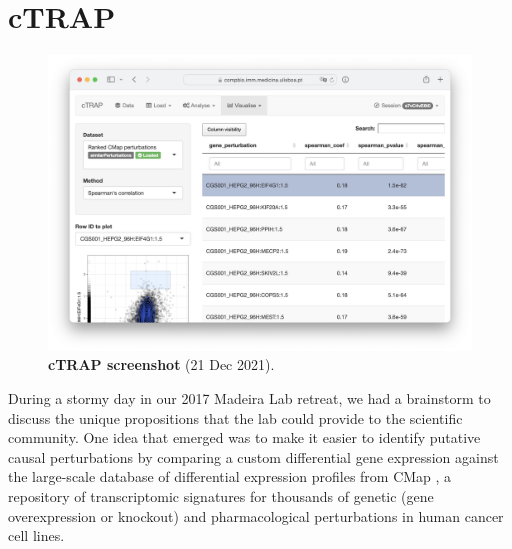
\chapter{cTRAP}
\label{chap:ctrap}

\begin{figure}[!b]
  \vspace*{-1cm}
  \includegraphics[width=.96\textwidth]{images/cTRAP/screenshot}
  \centering
  \vspace*{-.5cm}
  \caption[cTRAP screenshot]{\textbf{cTRAP screenshot} (21 Dec 2021).}
  \label{fig:cTRAP-screenshot}
\end{figure}

During a stormy day in our 2017 Madeira Lab retreat, we had a brainstorm to discuss the unique propositions that the lab could provide to the scientific community. One idea that emerged was to make it easier to identify putative causal perturbations by comparing a custom differential gene expression against the large-scale database of differential expression profiles from CMap \cite{subramanian:2017ul}, a repository of transcriptomic signatures for thousands of genetic (gene overexpression or knockout) and pharmacological perturbations in human cancer cell lines. %

